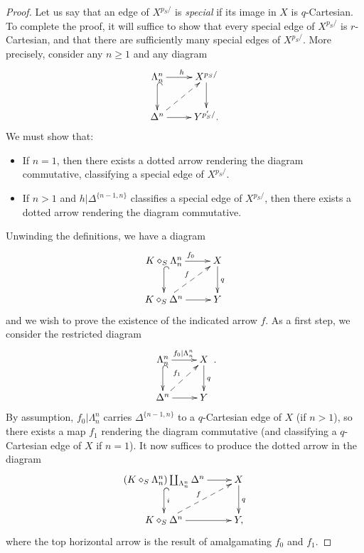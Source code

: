 \begin{proof}
Let us say that an edge of $X^{p_S/}$ is {\it special} if its image in $X$ is $q$-Cartesian. To complete the proof, it will suffice to show that every special edge of $X^{p_S/}$ is $r$-Cartesian, and that there are sufficiently many special edges of $X^{p_S/}$. More precisely, consider any $n \geq 1$ and any diagram
$$ \xymatrix{ \Lambda^n_n \ar[r]^{h} \ar@{^{(}->}[d] & X^{p_S/} \ar[d] \\
\Delta^n \ar[r] \ar@{-->}[ur] & Y^{p'_{S}/}.}$$
We must show that:
\begin{itemize}
\item If $n = 1$, then there exists a dotted arrow rendering the diagram commutative, classifying a special edge of $X^{p_S/}$. 
\item If $n > 1$ and $h| \Delta^{ \{n-1,n\} }$ classifies a special edge of $X^{p_S/}$, then there exists a dotted arrow rendering the diagram commutative.
\end{itemize}
Unwinding the definitions,  we have a diagram
$$ \xymatrix{ K \diamond_S \Lambda^n_n \ar[r]^{f_0} \ar@{^{(}->}[d] & X \ar[d]^{q} \\
K \diamond_S \Delta^n \ar[r] \ar@{-->}[ur]^{f} & Y}$$
and we wish to prove the existence of the indicated arrow $f$. As a first step, we consider the restricted diagram
$$ \xymatrix{ \Lambda^n_n \ar[r]^{f_0| \Lambda^n_n} \ar@{^{(}->}[d] & X \ar[d]^{q} \\
\Delta^n \ar[r] \ar@{-->}[ur]^{f_1} & Y}.$$
By assumption, $f_0 | \Lambda^n_n$ carries $\Delta^{ \{n-1,n\} }$ to a $q$-Cartesian edge of $X$ (if $n > 1$), so there exists a map $f_1$ rendering the diagram commutative (and classifying a $q$-Cartesian edge of $X$ if $n = 1$).
It now suffices to produce the dotted arrow in the diagram
$$ \xymatrix{ (K \diamond_S \Lambda^n_n) \coprod_{ \Lambda^n_n } \Delta^n  \ar[r] \ar@{^{(}->}[d]^{i} & X \ar[d]^{q} \\
K \diamond_S \Delta^n \ar[r] \ar@{-->}[ur]^{f} & Y,}$$
where the top horizontal arrow is the result of amalgamating $f_0$ and $f_1$.


\end{proof}
